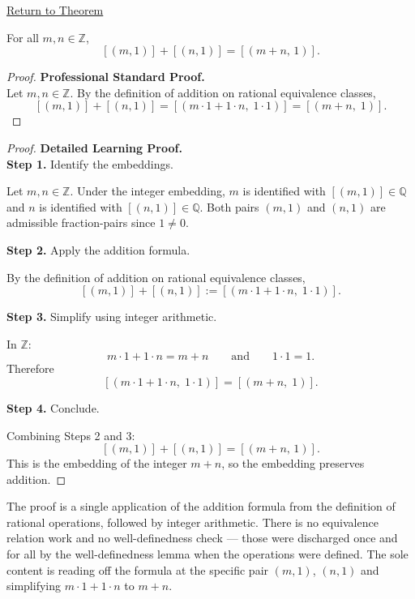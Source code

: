 \newpage
{}
\label{prf:ec-integer-embedding-add}

\begin{remark*}[Return]
\hyperref[thm:ec-integer-embedding-add]{Return to Theorem}
\end{remark*}

\begin{theorem*}
For all $m,n\in\mathbb{Z}$,
\[
[(m,1)] + [(n,1)] = [(m+n,\,1)].
\]
\end{theorem*}

\begin{proof}
\textbf{Professional Standard Proof.}~\\
Let $m,n\in\mathbb{Z}$.  By the definition of addition on rational
equivalence classes,
\[
[(m,1)] + [(n,1)]
= [(m\cdot 1 + 1\cdot n,\; 1\cdot 1)]
= [(m+n,\; 1)].
\]
\end{proof}

\begin{proof}
\textbf{Detailed Learning Proof.}~\\

\textbf{Step 1.} Identify the embeddings.

Let $m,n\in\mathbb{Z}$.  Under the integer embedding, $m$ is identified
with $[(m,1)]\in\mathbb{Q}$ and $n$ is identified with $[(n,1)]\in\mathbb{Q}$.
Both pairs $(m,1)$ and $(n,1)$ are admissible fraction-pairs since $1\neq 0$.

\textbf{Step 2.} Apply the addition formula.

By the definition of addition on rational equivalence classes,
\[
[(m,1)] + [(n,1)]
:= [(m\cdot 1 + 1\cdot n,\; 1\cdot 1)].
\]

\textbf{Step 3.} Simplify using integer arithmetic.

In $\mathbb{Z}$:
\[
m\cdot 1 + 1\cdot n = m + n
\qquad\text{and}\qquad
1\cdot 1 = 1.
\]
Therefore
\[
[(m\cdot 1 + 1\cdot n,\; 1\cdot 1)] = [(m+n,\; 1)].
\]

\textbf{Step 4.} Conclude.

Combining Steps 2 and 3:
\[
[(m,1)] + [(n,1)] = [(m+n,\,1)].
\]
This is the embedding of the integer $m+n$, so the embedding preserves
addition.
\end{proof}

\begin{remark*}
The proof is a single application of the addition formula from the definition
of rational operations, followed by integer arithmetic.  There is no
equivalence relation work and no well-definedness check --- those were
discharged once and for all by the well-definedness lemma when the
operations were defined.  The sole content is reading off the formula at
the specific pair $(m,1)$, $(n,1)$ and simplifying $m\cdot 1 + 1\cdot n$
to $m+n$.
\end{remark*}

